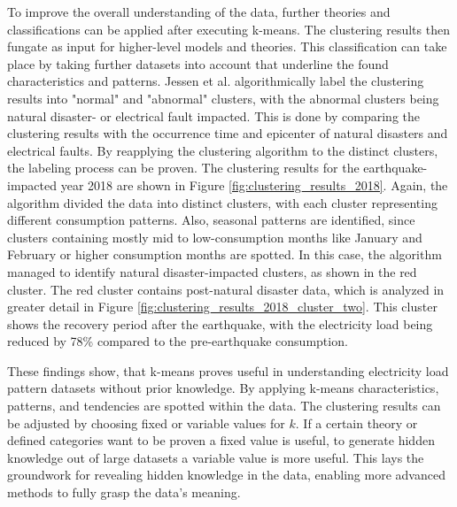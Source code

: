 To improve the overall understanding of the data, further theories and classifications can be applied after executing k-means.
The clustering results then fungate as input for higher-level models and theories.
This classification can take place by taking further datasets into account that underline the found characteristics and patterns.
Jessen et al. \cite{JES-IND} algorithmically label the clustering results into "normal" and "abnormal" clusters, with the abnormal clusters being natural disaster- or electrical fault impacted.
This is done by comparing the clustering results with the occurrence time and epicenter of natural disasters and electrical faults.
By reapplying the clustering algorithm to the distinct clusters, the labeling process can be proven.
The clustering results for the earthquake-impacted year 2018 are shown in Figure \ref{fig:clustering_results_2018}.
Again, the algorithm divided the data into distinct clusters, with each cluster representing different consumption patterns.
Also, seasonal patterns are identified, since clusters containing mostly mid to low-consumption months like January and February or higher consumption months are spotted.
In this case, the algorithm managed to identify natural disaster-impacted clusters, as shown in the red cluster.
The red cluster contains post-natural disaster data, which is analyzed in greater detail in Figure \ref{fig:clustering_results_2018_cluster_two}.
This cluster shows the recovery period after the earthquake, with the electricity load being reduced by 78\% compared to the pre-earthquake consumption.

These findings show, that k-means proves useful in understanding electricity load pattern datasets without prior knowledge.
By applying k-means characteristics, patterns, and tendencies are spotted within the data.
The clustering results can be adjusted by choosing fixed or variable values for $k$.
If a certain theory or defined categories want to be proven a fixed value is useful, to generate hidden knowledge out of large datasets a variable value is more useful.
This lays the groundwork for revealing hidden knowledge in the data, enabling more advanced methods to fully grasp the data's meaning.


